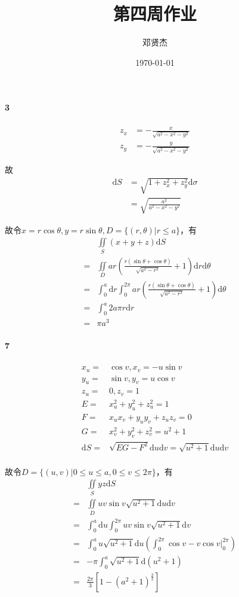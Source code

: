 \documentclass[UTF8]{ctexart}
\title{第四周作业}
\author{邓贤杰}
\date{\today}
\begin{document}
    \maketitle
\paragraph*{3}
\begin{align*}
    z_x &= -\frac{x}{\sqrt{a^2-x^2-y^2}} \\
    z_y &= -\frac{y}{\sqrt{a^2-x^2-y^2}} 
\end{align*}

故
\begin{align*}
    \mathrm{d}S &= \sqrt{1+z_x^2+z_y^2} \mathrm{d}\sigma \\
    &= \sqrt{\frac{a^2}{a^2-x^2-y^2} } 
\end{align*}

故令$x=r\cos \theta,y=r\sin \theta ,D=\{(r,\theta)| r \le a\} $，有
\begin{align*}
    &\iint \limits_S (x+y+z)\mathrm{d}S \\
    =& \iint \limits_D ar\left( \frac{r(\sin \theta + \cos \theta)}{\sqrt{a^2-r^2} }+1  \right) \mathrm{d}r \mathrm{d}\theta\\
    =& \int_{0}^{a} \mathrm{d}r \int_{0}^{2\pi} 
    ar\left( \frac{r(\sin \theta + \cos \theta)}{\sqrt{a^2-r^2} }+1  \right) \mathrm{d}\theta \\
    =& \int_{0}^{a} 2a\pi r \mathrm{d}r \\
    =& \pi a^3
\end{align*}
\paragraph*{7}
\begin{align*}
    x_u =& \cos v , x_v= -u \sin v\\
    y_u =& \sin v , y_v= u \cos v \\
    z_u =& 0, z_v = 1 \\
    E =& x_u^2 +y_u^2+z_u^2 =1\\
    F =& x_u x_v + y_u y_v + z_u z_v = 0\\
    G =& x_v^2 + y_v^2 + z_v^2 = u^2 + 1\\
    \mathrm{d}S =& \sqrt{EG-F^2} \mathrm{d}u \mathrm{d}v = \sqrt{u^2+1} \mathrm{d}u \mathrm{d}v\\
\end{align*}

故令$D=\{(u,v)| 0 \le u \le a, 0 \le v \le 2\pi\}$，有
\begin{align*}
    &\iint \limits_S yz \mathrm{d}S \\
    =& \iint \limits_D uv\sin v \sqrt{u^2+1} \mathrm{d}u \mathrm{d}v \\
    =& \int_{0}^{a} \mathrm{d}u \int_{0}^{2\pi} uv \sin v \sqrt{u^2+1} \mathrm{d}v \\ 
    =& \int_{0}^{a} u \sqrt{u^2+1} \mathrm{d}u (\int_{0}^{2\pi} \cos v - v \cos v \big|_{0}^{2\pi} ) \\
    =& -\pi \int_{0}^{a} \sqrt{u^2+1} \mathrm{d}(u^2+1) \\
    =& \frac{2\pi}{3} [1- (a^2+1)^{\frac{3}{2} }]
\end{align*}
\end{document}
